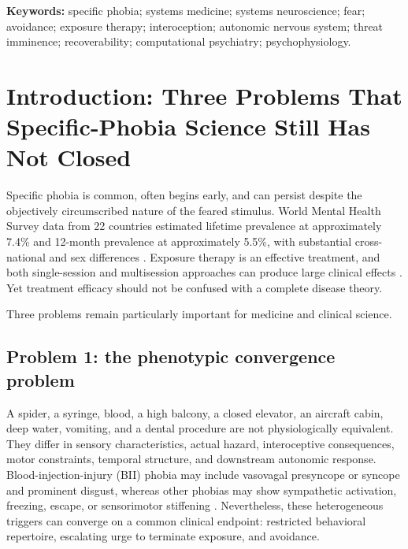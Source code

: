 \documentclass[11pt]{article}
\begin{document}
\begin{abstract}
The model incorporates established findings from fear and safety learning, avoidance, threat imminence, interoception, allostatic control, autonomic physiology, sensorimotor regulation, and exposure therapy without assigning causal primacy to either cognition or peripheral physiology. Its key falsifiable prediction is that experimentally manipulated recoverability horizon should predict the timing of defensive transition beyond objective threat, threat probability, uncertainty, perceived control, self-efficacy, physical threat imminence, and the number of available actions. Prospective tests are proposed for phobia onset, persistence, treatment response, durable remission, and relapse.
\end{abstract}

\noindent\textbf{Keywords:} specific phobia; systems medicine; systems neuroscience; fear; avoidance; exposure therapy; interoception; autonomic nervous system; threat imminence; recoverability; computational psychiatry; psychophysiology.

\section{Introduction: Three Problems That Specific-Phobia Science Still Has Not Closed}

Specific phobia is common, often begins early, and can persist despite the objectively circumscribed nature of the feared stimulus. World Mental Health Survey data from 22 countries estimated lifetime prevalence at approximately 7.4\% and 12-month prevalence at approximately 5.5\%, with substantial cross-national and sex differences \cite{wardenaar2017}. Exposure therapy is an effective treatment, and both single-session and multisession approaches can produce large clinical effects \cite{odgers2022}. Yet treatment efficacy should not be confused with a complete disease theory.

Three problems remain particularly important for medicine and clinical science.

\subsection{Problem 1: the phenotypic convergence problem}

A spider, a syringe, blood, a high balcony, a closed elevator, an aircraft cabin, deep water, vomiting, and a dental procedure are not physiologically equivalent. They differ in sensory characteristics, actual hazard, interoceptive consequences, motor constraints, temporal structure, and downstream autonomic response. Blood-injection-injury (BII) phobia may include vasovagal presyncope or syncope and prominent disgust, whereas other phobias may show sympathetic activation, freezing, escape, or sensorimotor stiffening \cite{ducasse2013,ritz2010}. Nevertheless, these heterogeneous triggers can converge on a common clinical endpoint: restricted behavioral repertoire, escalating urge to terminate exposure, and avoidance.
\end{document}
